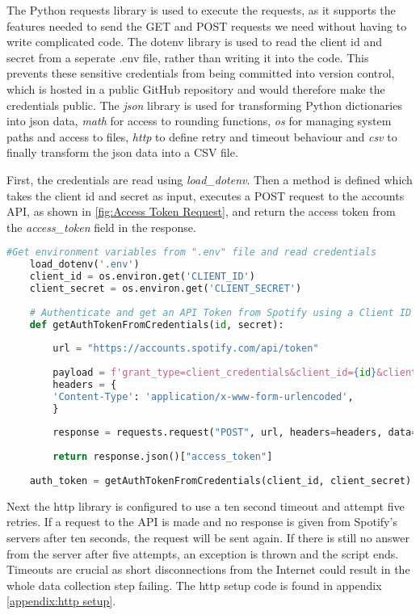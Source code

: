 The Python requests library is used to execute the requests, as it supports the features needed to send the GET and POST
requests we need without having to write complicated code.
The dotenv library is used to read the client id and secret from a seperate .env file, rather than writing it into the code.
This prevents these sensitive credentials from being committed into version control,
which is hosted in a public GitHub repository and would therefore make the credentials public.
The \emph{json} library is used for transforming Python dictionaries into json data, \emph{math} for access to rounding functions,
\emph{os} for managing system paths and access to files, \emph{http} to define retry and timeout behaviour and \emph{csv}
to finally transform the json data into a CSV file.

First, the credentials are read using \emph{load\_dotenv}. Then a method is defined which takes the client id and secret as input,
executes a POST request to the accounts API, as shown in \ref{fig:Access Token Request}, and return the access token from the
\emph{access\_token} field in the response. 

\begin{lstlisting}[language=Python]
    #Get environment variables from ".env" file and read credentials
    load_dotenv('.env')
    client_id = os.environ.get('CLIENT_ID')
    client_secret = os.environ.get('CLIENT_SECRET')
   
    # Authenticate and get an API Token from Spotify using a Client ID and secret
    def getAuthTokenFromCredentials(id, secret):
    
        url = "https://accounts.spotify.com/api/token"
    
        payload = f'grant_type=client_credentials&client_id={id}&client_secret={secret}'
        headers = {
        'Content-Type': 'application/x-www-form-urlencoded',
        }
    
        response = requests.request("POST", url, headers=headers, data=payload)
    
        return response.json()["access_token"]
    
    auth_token = getAuthTokenFromCredentials(client_id, client_secret)
\end{lstlisting} 

Next the http library is configured to use a ten second timeout and attempt five retries. If a request to the API is made
and no response is given from Spotify's servers after ten seconds, the request will be sent again. If there is still no
answer from the server after five attempts, an exception is thrown and the script ends.
Timeouts are crucial as short disconnections from the Internet could result in the whole data collection step failing.
The http setup code is found in appendix \ref{appendix:http setup}.

